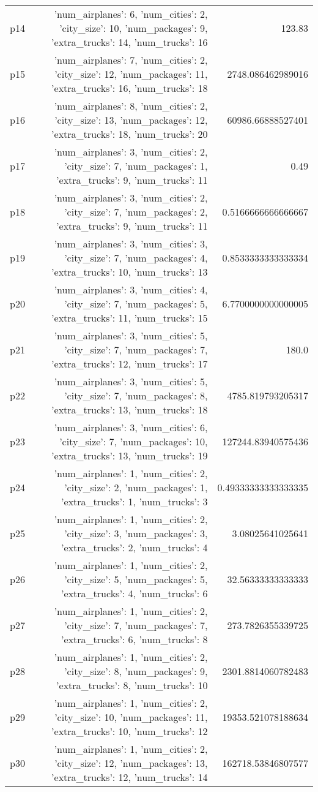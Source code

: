 \documentclass{article}
\begin{document}
\begin{center}
\begin{tabular}{r|r|r}
  p14&{'num\_airplanes': 6, 'num\_cities': 2, 'city\_size': 10, 'num\_packages': 9, 'extra\_trucks': 14, 'num\_trucks': 16}&123.83\\
  p15&{'num\_airplanes': 7, 'num\_cities': 2, 'city\_size': 12, 'num\_packages': 11, 'extra\_trucks': 16, 'num\_trucks': 18}&2748.086462989016\\
  p16&{'num\_airplanes': 8, 'num\_cities': 2, 'city\_size': 13, 'num\_packages': 12, 'extra\_trucks': 18, 'num\_trucks': 20}&60986.66888527401\\
  p17&{'num\_airplanes': 3, 'num\_cities': 2, 'city\_size': 7, 'num\_packages': 1, 'extra\_trucks': 9, 'num\_trucks': 11}&0.49\\
  p18&{'num\_airplanes': 3, 'num\_cities': 2, 'city\_size': 7, 'num\_packages': 2, 'extra\_trucks': 9, 'num\_trucks': 11}&0.5166666666666667\\
  p19&{'num\_airplanes': 3, 'num\_cities': 3, 'city\_size': 7, 'num\_packages': 4, 'extra\_trucks': 10, 'num\_trucks': 13}&0.8533333333333334\\
  p20&{'num\_airplanes': 3, 'num\_cities': 4, 'city\_size': 7, 'num\_packages': 5, 'extra\_trucks': 11, 'num\_trucks': 15}&6.7700000000000005\\
  p21&{'num\_airplanes': 3, 'num\_cities': 5, 'city\_size': 7, 'num\_packages': 7, 'extra\_trucks': 12, 'num\_trucks': 17}&180.0\\
  p22&{'num\_airplanes': 3, 'num\_cities': 5, 'city\_size': 7, 'num\_packages': 8, 'extra\_trucks': 13, 'num\_trucks': 18}&4785.819793205317\\
  p23&{'num\_airplanes': 3, 'num\_cities': 6, 'city\_size': 7, 'num\_packages': 10, 'extra\_trucks': 13, 'num\_trucks': 19}&127244.83940575436\\
  p24&{'num\_airplanes': 1, 'num\_cities': 2, 'city\_size': 2, 'num\_packages': 1, 'extra\_trucks': 1, 'num\_trucks': 3}&0.49333333333333335\\
  p25&{'num\_airplanes': 1, 'num\_cities': 2, 'city\_size': 3, 'num\_packages': 3, 'extra\_trucks': 2, 'num\_trucks': 4}&3.08025641025641\\
  p26&{'num\_airplanes': 1, 'num\_cities': 2, 'city\_size': 5, 'num\_packages': 5, 'extra\_trucks': 4, 'num\_trucks': 6}&32.56333333333333\\
  p27&{'num\_airplanes': 1, 'num\_cities': 2, 'city\_size': 7, 'num\_packages': 7, 'extra\_trucks': 6, 'num\_trucks': 8}&273.7826355339725\\
  p28&{'num\_airplanes': 1, 'num\_cities': 2, 'city\_size': 8, 'num\_packages': 9, 'extra\_trucks': 8, 'num\_trucks': 10}&2301.8814060782483\\
  p29&{'num\_airplanes': 1, 'num\_cities': 2, 'city\_size': 10, 'num\_packages': 11, 'extra\_trucks': 10, 'num\_trucks': 12}&19353.521078188634\\
  p30&{'num\_airplanes': 1, 'num\_cities': 2, 'city\_size': 12, 'num\_packages': 13, 'extra\_trucks': 12, 'num\_trucks': 14}&162718.53846807577
                            \end{tabular}
                            \end{center}
                    
\end{document}
